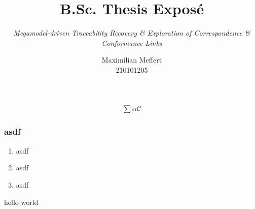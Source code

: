 \documentclass{beamer}
\title{B.Sc. Thesis Exposé}
\subtitle{\it Megamodel-driven Traceability Recovery \& Exploration of Correspondence \& Conformance Links}
\author{Maximilian Meffert\\210101205}
\institute{University of Koblenz-Landau}
\begin{document}
\beamertemplatenavigationsymbolsempty 

\frame{\titlepage}

\begin{frame}
\begin{align*}
\sum \alpha \mathcal{C}
\end{align*}
\end{frame}

\begin{frame}
\frametitle{asdf}
\begin{enumerate}[O1]
\item asdf
\item asdf
\item asdf
\end{enumerate}
\end{frame}

\begin{frame}
hello world
\end{frame}
\end{document}
